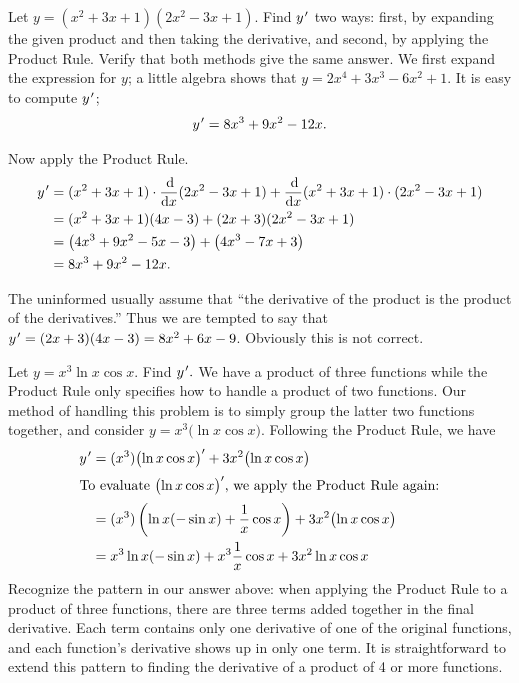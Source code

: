\begin{example}\label{ex_prod2}%
Let $y = (x^2+3x+1)(2x^2-3x+1)$. Find $y\primeskip'$ two ways: first, by expanding the given product and then taking the derivative, and second, by applying the Product Rule. Verify that both methods give the same answer.
\solution
We first expand the expression for $y$; a little algebra shows that $y = 2x^4+3x^3-6x^2+1$. It is easy to compute $y\primeskip'$;
\[y\primeskip' = 8x^3+9x^2-12x.\]

Now apply the Product Rule.
\begin{align*}
	y\primeskip'
	&=(x^2+3x+1)\cdot\frac{\dd}{\dd x}(2x^2-3x+1)+\frac{\dd}{\dd x}(x^2+3x+1)\cdot(2x^2-3x+1)\\
	&=(x^2+3x+1)(4x-3)+(2x+3)(2x^2-3x+1) \\
	&=\bigl(4x^3+9x^2-5x-3\bigr) + \bigl(4x^3-7x+3\bigr) \\
	&=8x^3+9x^2-12x.
\end{align*}

The uninformed usually assume that ``the derivative of the product is the product of the derivatives.'' Thus we are tempted to say that $y\primeskip' = (2x+3)(4x-3) = 8x^2+6x-9$. Obviously this is not correct.
\end{example}

\begin{example}\label{ex_prod10}%
Let $y = x^3\ln x\cos x$. Find $y\primeskip'.$
\solution
We have a product of three functions while the Product Rule only specifies how to handle a product of two functions. Our method of handling this problem is to simply group the latter two functions together, and consider $y = x^3\bigl(\ln x\cos x\bigr)$. Following the Product Rule, we have
\begin{align*}
	\yp &= (x^3)\bigl(\ln x\cos x\bigr)' + 3x^2\bigl(\ln x\cos x\bigr)\\
\intertext{To evaluate \intertextmath{\bigl(\ln x\cos x\bigr)'}, we apply the Product Rule again:}
		&= (x^3)\left(\ln x(-\sin x) + \frac1x\cos x\right)+ 3x^2\bigl(\ln x\cos x\bigr)\\
		&= x^3\ln x(-\sin x) + x^3\frac1x\cos x+ 3x^2\ln x\cos x
\end{align*} 
Recognize the pattern in our answer above: when applying the Product Rule to a product of three functions, there are three terms added together in the final derivative. Each term contains only one derivative of one of the original functions, and each function's derivative shows up in only one term. It is straightforward to extend this pattern to finding the derivative of a product of 4 or more functions.
\end{example}

